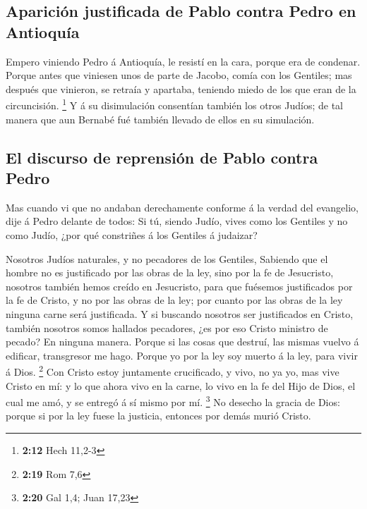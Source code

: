 \hypertarget{apariciuxf3n-justificada-de-pablo-contra-pedro-en-antioquuxeda}{%
\subsection{Aparición justificada de Pablo contra Pedro en
Antioquía}\label{apariciuxf3n-justificada-de-pablo-contra-pedro-en-antioquuxeda}}

 Empero viniendo Pedro á Antioquía, le resistí en la cara,
porque era de condenar.  Porque antes que viniesen unos de
parte de Jacobo, comía con los Gentiles; mas después que vinieron, se
retraía y apartaba, teniendo miedo de los que eran de la circuncisión.
\footnote{\textbf{2:12} Hech 11,2-3}  Y á su disimulación
consentían también los otros Judíos; de tal manera que aun Bernabé fué
también llevado de ellos en su simulación.

\hypertarget{el-discurso-de-reprensiuxf3n-de-pablo-contra-pedro}{%
\subsection{El discurso de reprensión de Pablo contra
Pedro}\label{el-discurso-de-reprensiuxf3n-de-pablo-contra-pedro}}

 Mas cuando vi que no andaban derechamente conforme á la
verdad del evangelio, dije á Pedro delante de todos: Si tú, siendo
Judío, vives como los Gentiles y no como Judío, ¿por qué constriñes á
los Gentiles á judaizar?

 Nosotros Judíos naturales, y no pecadores de los Gentiles,
 Sabiendo que el hombre no es justificado por las obras de
la ley, sino por la fe de Jesucristo, nosotros también hemos creído en
Jesucristo, para que fuésemos justificados por la fe de Cristo, y no por
las obras de la ley; por cuanto por las obras de la ley ninguna carne
será justificada.  Y si buscando nosotros ser justificados
en Cristo, también nosotros somos hallados pecadores, ¿es por eso Cristo
ministro de pecado? En ninguna manera.  Porque si las cosas
que destruí, las mismas vuelvo á edificar, transgresor me hago.
 Porque yo por la ley soy muerto á la ley, para vivir á
Dios. \footnote{\textbf{2:19} Rom 7,6}  Con Cristo estoy
juntamente crucificado, y vivo, no ya yo, mas vive Cristo en mí: y lo
que ahora vivo en la carne, lo vivo en la fe del Hijo de Dios, el cual
me amó, y se entregó á sí mismo por mí. \footnote{\textbf{2:20} Gal 1,4;
  Juan 17,23}  No desecho la gracia de Dios: porque si por
la ley fuese la justicia, entonces por demás murió Cristo.

